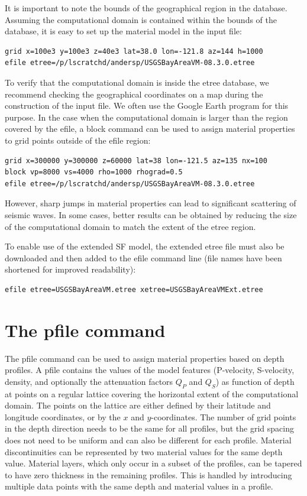 \documentclass[11pt]{report}
\begin{document}
It is important to note the bounds of the geographical region in the database. Assuming the
computational domain is contained within the bounds of the database, it is easy to set up the
material model in the input file:
\begin{verbatim}
grid x=100e3 y=100e3 z=40e3 lat=38.0 lon=-121.8 az=144 h=1000
efile etree=/p/lscratchd/andersp/USGSBayAreaVM-08.3.0.etree 
\end{verbatim}
To verify that the computational domain is inside the etree database, we recommend checking the
geographical coordinates on a map during the construction of the input file. We often use the Google Earth
program for this purpose.
%
In the case when the computational domain is larger than the region covered by the efile, a block
command can be used to assign material properties to grid points outside of the efile region:
\begin{verbatim}
grid x=300000 y=300000 z=60000 lat=38 lon=-121.5 az=135 nx=100
block vp=8000 vs=4000 rho=1000 rhograd=0.5
efile etree=/p/lscratchd/andersp/USGSBayAreaVM-08.3.0.etree 
\end{verbatim}
However, sharp jumps in material properties can lead to significant scattering of seismic waves. In
some cases, better results can be obtained by reducing the size of the computational domain to match
the extent of the etree region.

To enable use of the extended SF model, the extended etree file must also be downloaded and
then added to the efile command line (file names have been shortened for improved readability):
\begin{verbatim}
efile etree=USGSBayAreaVM.etree xetree=USGSBayAreaVMExt.etree
\end{verbatim}

\section{The pfile command}\label{sec:pfile}
The pfile command can be used to assign material properties based on depth profiles. A pfile
contains the values of the model features (P-velocity, S-velocity, density, and optionally the
attenuation factors $Q_P$ and $Q_S$) as function of depth at points on a regular lattice covering
the horizontal extent of the computational domain. The points on the lattice are either defined by
their latitude and longitude coordinates, or by the $x$ and $y$-coordinates. The number of grid
points in the depth direction needs to be the same for all profiles, but the grid spacing does not
need to be uniform and can also be different for each profile. Material discontinuities can be
represented by two material values for the same depth value. Material layers, which only occur in a
subset of the profiles, can be tapered to have zero thickness in the remaining profiles. This is
handled by introducing multiple data points with the same depth and material values in a profile.
\end{document}
